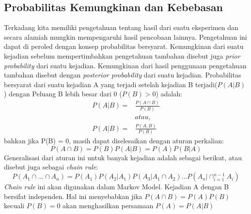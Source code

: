 \subsection{Probabilitas Kemungkinan dan Kebebasan}
Terkadang kita memiliki pengetahuan tentang hasil dari suatu eksperimen dan secara alamiah mungkin mempengaruhi hasil pencobaan lainnya. Pengetahuan ini dapat di peroled dengan konsep probabilitas bersyarat. Kemungkinan dari suatu kejadian sebelum mempertimbahkan pengetahuan tambahan disebut juga \textit{prior probability} dari suatu kejadian. Kemungkinan dari hasil penggunaan pengetahuan tambahan disebut dengan \textit{posterior probability} dari suatu kejadian. Probabilitas bersyarat dari suatu kejadian A yang terjadi setelah kejadian B terjadi(\(P(A|B)\)) dengan Peluang B lebih besar dari 0 (\(P(B)>0\)) adalah:
\begin{align*}
	P(A|B) =& \frac{P(A\cap B)}{P(B)}\\
	&atau,\\
	P(A|B) =& \frac{P(A,B)}{P(B)}
\end{align*}
bahkan jika P(B) = 0, masih dapat diselesaikan dengan aturan perkalian:
\[
	P(A\cap B) = P(B)P(A|B) = P(A)P(B|A)
\]
Generalisasi dari aturan ini untuk banyak kejadian adalah sebagai berikut, atau disebut juga sebagai \textit{chain rule}:
\[
	P(A_1\cap ...\cap A_n)=P(A_1)P(A_2|A_1)P(A_3|A_1\cap A_2)...P(A_n|\cap^{n-1}_{i=1} A_i)
\]
\textit{Chain rule} ini akan digunakan dalam Markov Model.
Kejadian A dengan B bersifat independen. Hal ini menyebabkan jika \(P(A\cap B) = P(A)P(B)\) kecuali \(P(B) = 0 \) akan menghasilkan persamaan \(P(A) = P(A|B)\)
